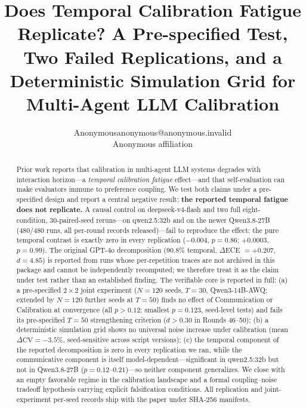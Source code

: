 \documentclass[11pt]{article}
\title{Does Temporal Calibration Fatigue Replicate? A Pre-specified Test, Two Failed Replications, and a Deterministic Simulation Grid for Multi-Agent LLM Calibration}
\author{\name Anonymous\email anonymous@anonymous.invalid\\\addr Anonymous affiliation}
\date{}
\newcommand{\CV}{\ensuremath{\mathrm{CV}}}
\theoremstyle{definition}
\theoremstyle{remark}
\begin{document}
\maketitle

\begin{abstract}
Prior work reports that calibration in multi-agent LLM systems degrades with interaction horizon---a \textit{temporal calibration fatigue} effect---and that self-evaluation can make evaluators immune to preference coupling. We test both claims under a pre-specified design and report a central negative result: \textbf{the reported temporal fatigue does not replicate.} A causal control on deepseek-v4-flash and two full eight-condition, 30-paired-seed reruns---on qwen2.5:32b and on the newer Qwen3.8-27B (480/480 runs, all per-round records released)---fail to reproduce the effect: the pure temporal contrast is exactly zero in every replication ($-0.004$, $p = 0.86$; $+0.0003$, $p = 0.99$). The original GPT-4o decomposition (90.8\% temporal, $\Delta$ECE $= +0.207$, $d = 4.85$) is reported from runs whose per-repetition traces are not archived in this package and cannot be independently recomputed; we therefore treat it as the claim under test rather than an established finding. The verifiable core is reported in full: (a) a pre-specified $2 \times 2$ joint experiment ($N{=}120$ seeds, $T{=}30$, Qwen3-14B-AWQ; extended by $N{=}120$ further seeds at $T{=}50$) finds no effect of Communication or Calibration at convergence (all $p > 0.12$; smallest $p = 0.123$, seed-level tests) and fails its pre-specified $T{=}50$ strengthening criterion ($d > 0.30$ in Rounds 46--50); (b) a deterministic simulation grid shows no universal noise increase under calibration (mean $\Delta\CV = -3.5\%$, seed-sensitive across script versions); (c) the temporal component of the reported decomposition is zero in every replication we ran, while the communicative component is itself model-dependent---significant in qwen2.5:32b but not in Qwen3.8-27B ($p = 0.12$--$0.21$)---so neither component generalizes. We close with an empty favorable regime in the calibration landscape and a formal coupling--noise tradeoff hypothesis carrying explicit falsification conditions. All replication and joint-experiment per-seed records ship with the paper under SHA-256 manifests.
\end{abstract}

\newpage

\end{document}
